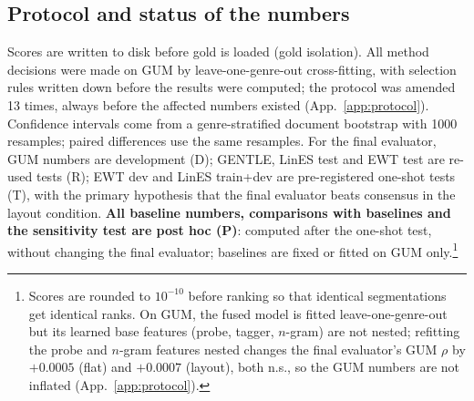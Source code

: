 \subsection{Protocol and status of the numbers}
\label{sec:protocol}
Scores are written to disk before gold is loaded (gold isolation). All method decisions were made on GUM by
leave-one-genre-out cross-fitting, with selection rules written down before the results were computed; the
protocol was amended 13 times, always before the affected numbers existed (App.~\ref{app:protocol}). Confidence intervals
come from a genre-stratified document bootstrap \citep{efron-tibshirani-1993-introduction} with 1000 resamples; paired
differences use the same resamples. For the final evaluator, GUM numbers are development (D); GENTLE, LinES test and EWT
test are re-used tests (R); EWT dev and LinES train+dev are pre-registered one-shot tests (T), with the primary hypothesis
that the final evaluator beats consensus in the layout condition. \textbf{All baseline numbers, comparisons with
baselines and the sensitivity test are post hoc (P)}: computed after the one-shot test, without changing the final
evaluator; baselines are fixed or fitted on GUM only.\footnote{Scores are rounded to $10^{-10}$ before ranking so that
identical segmentations get identical ranks. On GUM, the fused model is fitted leave-one-genre-out but its learned base
features (probe, tagger, $n$-gram) are not nested; refitting the probe and $n$-gram features nested changes the final
evaluator's GUM $\rho$ by $+0.0005$ (flat) and $+0.0007$ (layout), both n.s., so the GUM numbers are not inflated
(App.~\ref{app:protocol}).}
